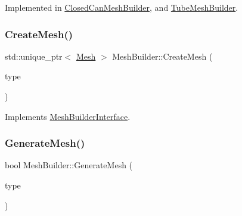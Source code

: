 Implemented in \mbox{\hyperlink{class_closed_can_mesh_builder_a5d9a174577e0957f768300b32fd367cf}{Closed\+Can\+Mesh\+Builder}}, and \mbox{\hyperlink{class_tube_mesh_builder_a16c5008efeefa80378f86b2a8e116af4}{Tube\+Mesh\+Builder}}.

\mbox{\label{class_mesh_builder_a51d89fe601df06e63112c70416ac03dc}} 
\subsubsection{\texorpdfstring{CreateMesh()}{CreateMesh()}}
{\footnotesize\ttfamily std\+::unique\+\_\+ptr$<$ \mbox{\hyperlink{class_mesh}{Mesh}} $>$ Mesh\+Builder\+::\+Create\+Mesh (\begin{DoxyParamCaption}\item[{\mbox{\hyperlink{_abstract_factory_2_abstract_factory_2builder_2_mesh_builder_8h_ad6436347ddb93aed826a19081b53dd61}{M\+E\+S\+H\+T\+Y\+PE}}}]{type }\end{DoxyParamCaption})\hspace{0.3cm}{\ttfamily [virtual]}}



Implements \mbox{\hyperlink{class_mesh_builder_interface_a2d9b31466ef198b2029438970af81323}{Mesh\+Builder\+Interface}}.

\mbox{\label{class_mesh_builder_a9c48199d6ecab1f9c102e48d1b474f5a}} 
\subsubsection{\texorpdfstring{GenerateMesh()}{GenerateMesh()}}
{\footnotesize\ttfamily bool Mesh\+Builder\+::\+Generate\+Mesh (\begin{DoxyParamCaption}\item[{\mbox{\hyperlink{_abstract_factory_2_abstract_factory_2builder_2_mesh_builder_8h_ad6436347ddb93aed826a19081b53dd61}{M\+E\+S\+H\+T\+Y\+PE}}}]{type }\end{DoxyParamCaption})}

\mbox{\label{class_mesh_builder_a2db99e42ca33437243c6875a85417ef0}} 

